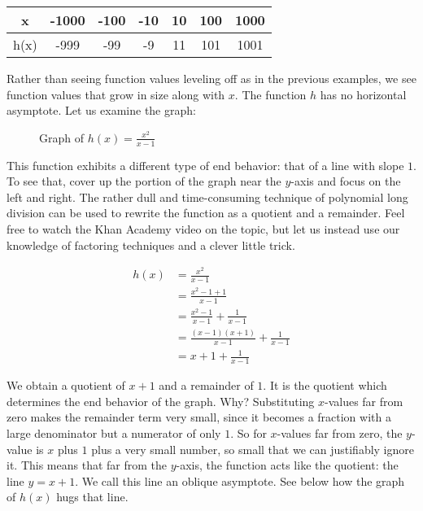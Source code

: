 \begin{center}
\begin{tabular}{ |c|c|c|c|c|c|c| } 
 \hline
 x & -1000 & -100 & -10 & 10 & 100 & 1000 \\ 
 \hline
 h(x) & -999 & -99 & -9 & 11 & 101 & 1001 \\ 
 \hline
\end{tabular}
\end{center}

Rather than seeing function values leveling off as in the previous examples, we see function values that grow in size along with \( x \). The function \( h \) has no horizontal asymptote. Let us examine the graph:

\begin{figure}[htbp]
  \centering
  \caption{Graph of \( h(x) = \frac{x^2}{x - 1} \)}
\end{figure}

This function exhibits a different type of end behavior: that of a line with slope \( 1 \). To see that, cover up the portion of the graph near the \( y \)-axis and focus on the left and right. The rather dull and time-consuming technique of polynomial long division can be used to rewrite the function as a quotient and a remainder. Feel free to watch the Khan Academy video on the topic, but let us instead use our knowledge of factoring techniques and a clever little trick.

\begin{equation} \label{eq1}
\begin{split}
h(x) & = \frac{x^2}{x - 1} \\
& = \frac{x^2 - 1 + 1}{x - 1} \\ 
& = \frac{x^2 - 1}{x - 1} + \frac{1}{x - 1} \\
& = \frac{(x - 1)(x + 1)}{x - 1} + \frac{1}{x - 1} \\
& = x + 1 + \frac{1}{x - 1}
\end{split}
\end{equation}

We obtain a quotient of \( x + 1 \) and a remainder of \( 1 \). It is the quotient which determines the end behavior of the graph. Why? Substituting \( x \)-values far from zero makes the remainder term very small, since it becomes a fraction with a large denominator but a numerator of only \( 1 \). So for \( x \)-values far from zero, the \( y \)-value is \( x \) plus \( 1 \) plus a very small number, so small that we can justifiably ignore it. This means that far from the \( y \)-axis, the function acts like the quotient: the line \( y = x + 1 \). We call this line an oblique asymptote. See below how the graph of \( h(x) \) hugs that line.

